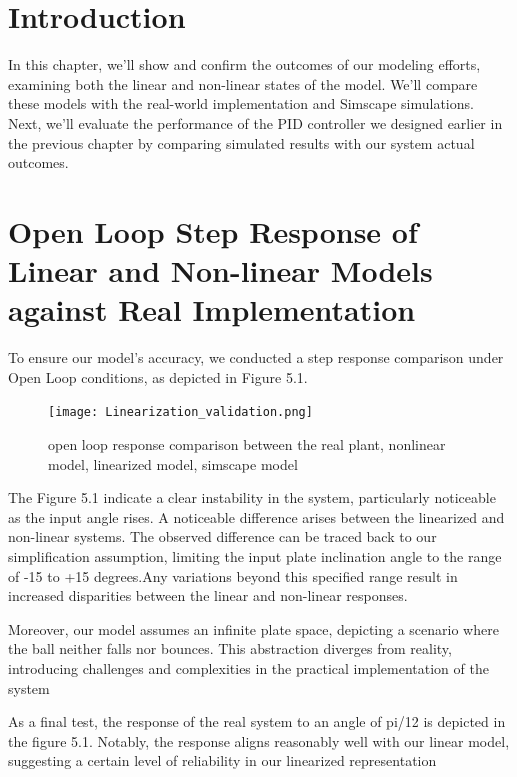 \graphicspath{ {Figures/chapter05} }
\section{Introduction}
In this chapter, we'll show and confirm the outcomes of our modeling efforts, examining both the linear and non-linear states of the model. We'll compare these models with the real-world implementation and Simscape simulations. Next, we'll evaluate the performance of the PID controller we designed earlier in the previous chapter by comparing simulated results with our system actual outcomes.
\section{Open Loop Step Response of Linear and Non-linear Models against Real Implementation}
To ensure our model's accuracy, we conducted a step response comparison under Open Loop conditions, as depicted in Figure 5.1.
\begin{figure}[h]
    \centering
    \texttt{[image: Linearization\_validation.png]}
    \caption{open loop response comparison between the real plant, nonlinear model, linearized model, simscape model}
    \label{fig:enter-label}
\end{figure}
The Figure 5.1 indicate a clear instability in the system, particularly noticeable as the input angle rises. A noticeable difference arises between the linearized and non-linear systems. The observed difference can be traced back to our simplification assumption,  limiting the input plate inclination angle to the range of -15 to +15 degrees.Any variations beyond this specified range result in increased disparities between the linear and non-linear responses.

Moreover, our model assumes an infinite plate space, depicting a scenario where the ball neither falls nor bounces. This abstraction diverges from reality, introducing challenges and complexities in the practical implementation of the system

As a final test, the response of the real system to an angle of pi/12 is depicted in the figure 5.1. Notably, the response aligns reasonably well with our linear model, suggesting a certain level of reliability in our linearized representation

